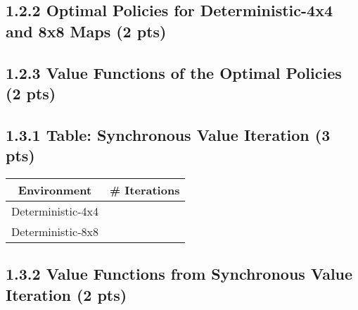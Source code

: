 \documentclass[12pt]{article}
\begin{document}
\subsection*{1.2.2 Optimal Policies for Deterministic-4x4 and 8x8 Maps (2 pts)}
\begin{solution}[height=6.5cm]
\begin{center}
\begin{minipage}[c]{0.3\textwidth}

\end{minipage}
\begin{minipage}[c]{0.3\textwidth}

\end{minipage}
\end{center}
\end{solution}

\subsection*{1.2.3 Value Functions of the Optimal Policies (2 pts)}
\begin{solution}[height=6.8cm]
\end{solution}

\subsection*{1.3.1 Table: Synchronous Value Iteration (3 pts)}
\begin{center}
  \begin{tabular}{|c|c|}\hline
    {\bf Environment} & {\bf \# Iterations} \\ \hline
    Deterministic-4x4 & \\ \hline
    Deterministic-8x8 & \\ \hline
  \end{tabular}
\end{center}
\newpage
\subsection*{1.3.2 Value Functions from Synchronous Value Iteration (2 pts)}
\begin{solution}[height=6.8cm]
\end{solution}
\end{document}
